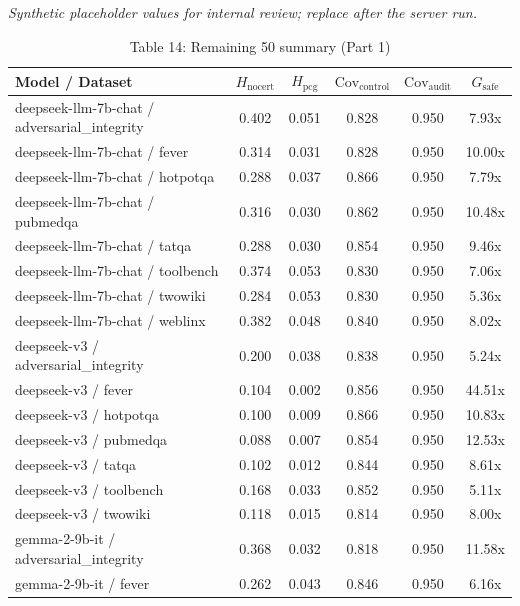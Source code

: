 

\begin{table}[h]
\centering
\small
  \textit{Synthetic placeholder values for internal review; replace after the server run.}
\caption{Table 14: Remaining 50 summary (Part 1)}
\label{tab:appendix_remaining_50_summary_1}
\begin{tabular}{l|cc|cc|c}
\hline
Model / Dataset & $H_{\mathrm{nocert}}$ & $H_{\mathrm{pcg}}$ & $\mathrm{Cov}_{\mathrm{control}}$ & $\mathrm{Cov}_{\mathrm{audit}}$ & $G_{\mathrm{safe}}$ \\
\hline
deepseek-llm-7b-chat / adversarial_integrity & 0.402 & 0.051 & 0.828 & 0.950 & 7.93x \\
deepseek-llm-7b-chat / fever & 0.314 & 0.031 & 0.828 & 0.950 & 10.00x \\
deepseek-llm-7b-chat / hotpotqa & 0.288 & 0.037 & 0.866 & 0.950 & 7.79x \\
deepseek-llm-7b-chat / pubmedqa & 0.316 & 0.030 & 0.862 & 0.950 & 10.48x \\
deepseek-llm-7b-chat / tatqa & 0.288 & 0.030 & 0.854 & 0.950 & 9.46x \\
deepseek-llm-7b-chat / toolbench & 0.374 & 0.053 & 0.830 & 0.950 & 7.06x \\
deepseek-llm-7b-chat / twowiki & 0.284 & 0.053 & 0.830 & 0.950 & 5.36x \\
deepseek-llm-7b-chat / weblinx & 0.382 & 0.048 & 0.840 & 0.950 & 8.02x \\
deepseek-v3 / adversarial_integrity & 0.200 & 0.038 & 0.838 & 0.950 & 5.24x \\
deepseek-v3 / fever & 0.104 & 0.002 & 0.856 & 0.950 & 44.51x \\
deepseek-v3 / hotpotqa & 0.100 & 0.009 & 0.866 & 0.950 & 10.83x \\
deepseek-v3 / pubmedqa & 0.088 & 0.007 & 0.854 & 0.950 & 12.53x \\
deepseek-v3 / tatqa & 0.102 & 0.012 & 0.844 & 0.950 & 8.61x \\
deepseek-v3 / toolbench & 0.168 & 0.033 & 0.852 & 0.950 & 5.11x \\
deepseek-v3 / twowiki & 0.118 & 0.015 & 0.814 & 0.950 & 8.00x \\
gemma-2-9b-it / adversarial_integrity & 0.368 & 0.032 & 0.818 & 0.950 & 11.58x \\
gemma-2-9b-it / fever & 0.262 & 0.043 & 0.846 & 0.950 & 6.16x \\

\end{tabular}
\end{table}
